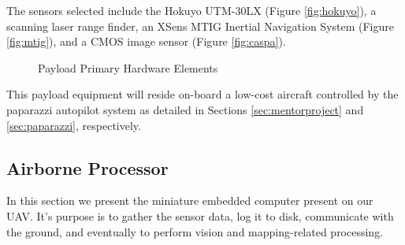 \documentclass[a4paper,11pt]{report}
\begin{document}
The sensors selected include the Hokuyo UTM-30LX (Figure \ref{fig:hokuyo}), a scanning laser range finder, an XSens MTIG Inertial Navigation System (Figure  \ref{fig:mtig}), and a CMOS image sensor (Figure \ref{fig:caspa}).

\begin{figure}[htb]
  \centering
  \caption{Payload Primary Hardware Elements}
  \label{fig:sensors}
\end{figure}

This payload equipment will reside on-board a low-cost aircraft controlled by the paparazzi autopilot system as detailed in Sections \ref{sec:mentorproject} and \ref{sec:paparazzi}, respectively.

\subsection{Airborne Processor}
\label{sec:AirborneProcessor}

In this section we present the miniature embedded computer present on our UAV. It's purpose is to gather the sensor data, log it to disk, communicate with the ground, and eventually to perform vision and mapping-related processing.
\end{document}
